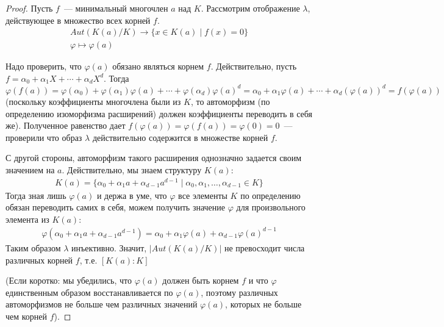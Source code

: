 \begin{proof}
    Пусть $f$~--- минимальный многочлен $a$ над $K$.
    Рассмотрим отображение $\lambda$, действующее в множество всех корней $f$.
    \begin{gather*}
        Aut(K(a)/K) \longrightarrow \{ x \in K(a) \mid f(x) = 0 \} \\
        \varphi \mapsto \varphi(a)
    \end{gather*}

    Надо проверить, что $\varphi(a)$ обязано являться корнем $f$.
    Действительно, пусть $f=\alpha_0 + \alpha_1 X + \cdots + \alpha_d X^d$.
    Тогда $\varphi(f(a)) = \varphi(\alpha_0) + \varphi(\alpha_1) \varphi(a) + \cdots + \varphi(\alpha_d) \varphi(a)^d = \alpha_0 + \alpha_1 \varphi(a) + \cdots + \alpha_d (\varphi(a))^d = f(\varphi(a))$ (поскольку коэффициенты многочлена были из $K$, то автоморфизм (по определению изоморфизма расширений) должен коэффициенты переводить в себя же).
    Полученное равенство дает $f(\varphi(a))=\varphi(f(a))=\varphi(0)=0$~--- проверили что образ $\lambda$ действительно содержится в множестве корней $f$.

    С другой стороны, автоморфизм такого расширения однозначно задается своим значением на $a$.
    Действительно, мы знаем структуру $K(a)$:
    \begin{gather*}
        K(a) = \{ \alpha_0 + \alpha_1 a + \alpha_{d-1}a^{d-1} \mid \alpha_0, \alpha_1, \ldots, \alpha_{d-1} \in K \}
    \end{gather*}
    Тогда зная лишь $\varphi(a)$ и держа в уме, что $\varphi$ все элементы $K$ по определению обязан переводить самих в себя, можем получить значение $\varphi$ для произвольного элемента из $K(a)$:
    \begin{gather*}
        \varphi(\alpha_0 + \alpha_1 a + \alpha_{d-1}a^{d-1}) = \alpha_0 + \alpha_1 \varphi(a) + \alpha_{d-1}\varphi(a)^{d-1}
    \end{gather*}
    Таким образом $\lambda$ инъективно.
    Значит, $\left|Aut(K(a)/K) \right|$ не превосходит числа различных корней $f$, т.е. $[K(a):K]$

    (Если коротко: мы убедились, что $\varphi(a)$ должен быть корнем $f$ и что $\varphi$ единственным образом восстанавливается по $\varphi(a)$, поэтому различных автоморфизмов не больше чем различных значений $\varphi(a)$, которых не больше чем корней $f$).
\end{proof}

